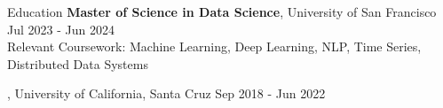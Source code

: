 \documentclass{resume} %
\begin{document}
\begin{rSection}{Education}
    {\bf Master of Science in Data Science}, University of San Francisco \hfill {Jul 2023 - Jun 2024}
    \\Relevant Coursework: Machine Learning, Deep Learning,
    NLP, Time Series, Distributed Data Systems

    , University of California, Santa Cruz \hfill {Sep 2018 - Jun 2022}
\end{rSection}

\end{document}
